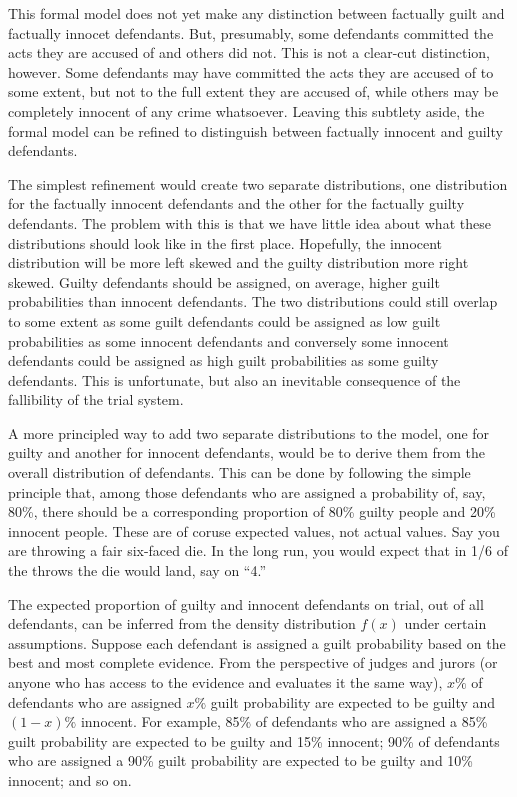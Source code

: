 \documentclass[
  10pt,
  dvipsnames,enabledeprecatedfontcommands]{scrartcl}
\begin{document}
This formal model does not yet make any distinction between factually
guilt and factually innocet defendants. But, presumably, some defendants
committed the acts they are accused of and others did not. This is not a
clear-cut distinction, however. Some defendants may have committed the
acts they are accused of to some extent, but not to the full extent they
are accused of, while others may be completely innocent of any crime
whatsoever. Leaving this subtlety aside, the formal model can be refined
to distinguish between factually innocent and guilty defendants.

The simplest refinement would create two separate distributions, one
distribution for the factually innocent defendants and the other for the
factually guilty defendants. The problem with this is that we have
little idea about what these distributions should look like in the first
place. Hopefully, the innocent distribution will be more left skewed and
the guilty distribution more right skewed. Guilty defendants should be
assigned, on average, higher guilt probabilities than innocent
defendants. The two distributions could still overlap to some extent as
some guilt defendants could be assigned as low guilt probabilities as
some innocent defendants and conversely some innocent defendants could
be assigned as high guilt probabilities as some guilty defendants. This
is unfortunate, but also an inevitable consequence of the fallibility of
the trial system.

A more principled way to add two separate distributions to the model,
one for guilty and another for innocent defendants, would be to derive
them from the overall distribution of defendants. This can be done by
following the simple principle that, among those defendants who are
assigned a probability of, say, 80\%, there should be a corresponding
proportion of 80\% guilty people and 20\% innocent people. These are of
coruse expected values, not actual values. Say you are throwing a fair
six-faced die. In the long run, you would expect that in 1/6 of the
throws the die would land, say on ``4.''

The expected proportion of guilty and innocent defendants on trial, out
of all defendants, can be inferred from the density distribution
\(f(x)\) under certain assumptions. Suppose each defendant is assigned a
guilt probability based on the best and most complete evidence. From the
perspective of judges and jurors (or anyone who has access to the
evidence and evaluates it the same way), \(x\%\) of defendants who are
assigned \(x\%\) guilt probability are expected to be guilty and
\((1-x)\%\) innocent. For example, 85\% of defendants who are assigned a
85\% guilt probability are expected to be guilty and 15\% innocent; 90\%
of defendants who are assigned a 90\% guilt probability are expected to
be guilty and 10\% innocent; and so on.
\end{document}

